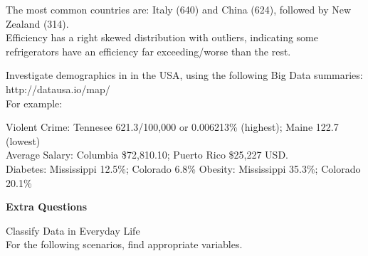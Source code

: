 \documentclass[bigtut]{tutorial}\usepackage[]{graphicx}\usepackage[]{color}
\begin{document}
\begin{tutorial}
\begin{questions}
\begin{solution}
\vspace{.5cm}
The most common countries are: Italy (640) and China (624), followed by New Zealand (314). \\
Efficiency has a right skewed distribution with outliers, indicating some refrigerators have an efficiency far exceeding/worse than the rest.
\end{solution}


\vspace{.5cm}
\question
Investigate demographics in in the USA, using the following Big Data summaries:
http://datausa.io/map/ \\

For example: 


\vspace{.5cm}
\begin{solution}
Violent Crime: Tennesee 621.3/100,000 or 0.006213\% (highest); Maine 122.7 (lowest) \\
Average Salary: Columbia  \$72,810.10; Puerto Rico \$25,227 USD. \\
Diabetes: Mississippi 12.5\%; Colorado 6.8\%
Obesity: Mississippi 35.3\%; Colorado 20.1\% \\
\end{solution}



\newpage
\hspace{-1cm} {\bf Extra Questions}

\question Classify Data in Everyday Life \\

For the following scenarios, find appropriate variables. \\


\end{questions}
\end{tutorial}
\end{document}
